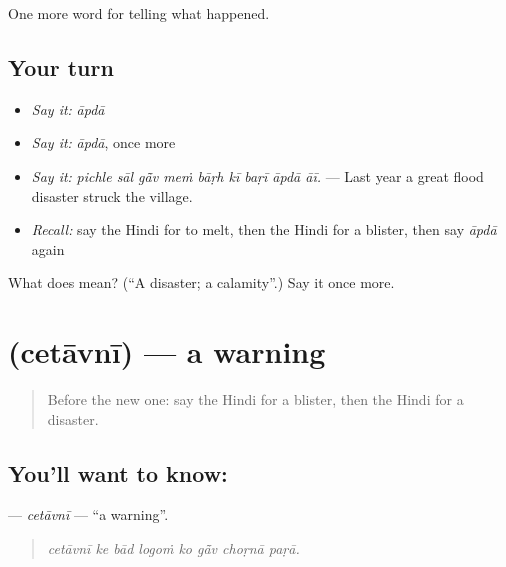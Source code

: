 \begin{grammarlens}[title={What you've built}]
One more word for telling what happened.
\end{grammarlens}

\subsection*{Your turn}
\begin{itemize}
\raggedright
  \item \emph{Say it:} \emph{āpdā}
  \item \emph{Say it:} \emph{āpdā}, once more
  \item \emph{Say it:} \emph{pichle sāl gā̃v meṁ bāṛh kī baṛī āpdā āī.} — Last year a great flood disaster struck the village.
  \item \emph{Recall:} say the Hindi for to melt, then the Hindi for a blister, then say \emph{āpdā} again
\end{itemize}

\begin{tcolorbox}[breakable,colback=teal!4,colframe=teal!35!black,title={Before you move on}]
What does  mean? (\textquotedblleft{}A disaster; a calamity\textquotedblright{}.) Say it once more.
\end{tcolorbox}
\section[\texorpdfstring{\hi{चेतावनी} (cetāvnī)}{चेतावनी (cetāvnī)}]{ (cetāvnī) — a warning}

\label{lesson:HI-C302-cetavni}



\begin{quote}
Before the new one: say the Hindi for a blister, then the Hindi for a disaster.
\end{quote}

\subsection*{You'll want to know: }
\textbf{} — \emph{cetāvnī} — \textquotedblleft{}a warning\textquotedblright{}.

\begin{quote}
       
\end{quote}

\begin{quote}
\emph{cetāvnī ke bād logoṁ ko gā̃v choṛnā paṛā.}
\end{quote}

